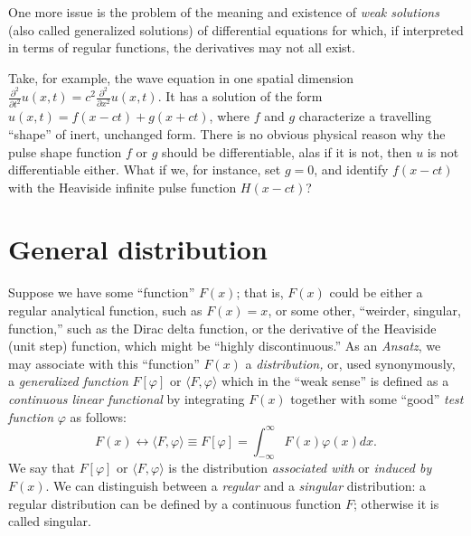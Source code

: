 One more issue is the problem of the meaning and existence of
{\em weak solutions} (also called   generalized solutions)
of differential equations  for which, if interpreted in terms of regular functions,
the derivatives may not all exist.

{
\color{blue}
\bexample
Take, for example, the wave equation in one spatial dimension
$
\frac{\partial^2 }{\partial t^2} u(x,t)
=c^2
\frac{\partial^2 }{\partial x^2} u(x,t)
.
$
It has a  solution of the form\cite{Barut1990349} $ u(x,t)= f(x-ct) + g(x+ct)$,
where $f$ and $g$ characterize  a travelling ``shape'' of inert, unchanged form.
There is no obvious physical reason why the pulse shape function $f$ or $g$ should be differentiable,
alas if it is not, then $u$ is not differentiable either.
What if we, for instance, set $g=0$, and identify $f(x-ct)$ with the Heaviside infinite pulse function $H(x-ct)$?

\eexample
}


\section{General distribution}

Suppose we have some ``function'' $F(x)$; that is, $F(x)$ could be either
a regular analytical function, such as $F(x)=x$,
or some other, ``weirder, singular, function,'' such as the Dirac delta function,
or the derivative of the Heaviside (unit step) function, which might be ``highly discontinuous.''
As an {\it Ansatz},  we may associate with this ``function'' $F(x)$
a
{\em distribution,}
or, used synonymously,
a
{\em generalized function}
$F[\varphi ]$
or $\langle F , \varphi \rangle $
which
in the ``weak sense'' is  defined as a {\em continuous linear functional}
by integrating $F(x)$ together with some ``good'' {\em test function} $\varphi$
as follows:\cite[-10mm]{schwartz}
\begin{equation}
 F(x) \longleftrightarrow \langle F , \varphi \rangle \equiv F[\varphi] =\int_{-\infty}^{\infty} F(x) \varphi (x) dx.
\end{equation}
We say that $F[\varphi ]$ or $\langle F , \varphi \rangle $ is the distribution {\em associated with}
or {\em induced by}
$F(x)$.
We can distinguish between a
{\em regular}
and a
{\em singular}
distribution:
a regular distribution can be defined by a continuous function $F$; otherwise it is called singular.


